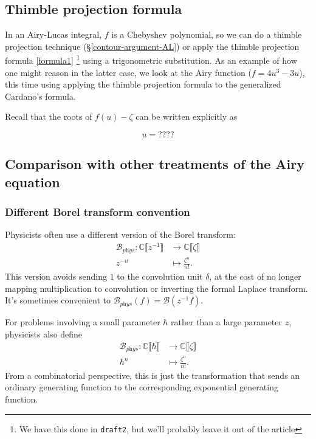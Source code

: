 \documentclass{article}
\theoremstyle{definition}
\newcommand{\maps}{\colon}
\newcommand{\C}{\mathbb{C}}
\newcommand{\borel}{\mathcal{B}}
\begin{document}
\subsection{Thimble projection formula}

In an Airy-Lucas integral, $f$ is a Chebyshev polynomial, so we can do a thimble projection technique (\S \ref{contour-argument-AL}) or apply the thimble projection formula \eqref{formula1} \textcolor{red}{\footnote{We have this done in \texttt{draft2}, but we'll probably leave it out of the article}} using a trigonometric substitution. As an example of how one might reason in the latter case, we look at the Airy function ($f = 4u^3-3u$), this time using applying the thimble projection formula to the generalized Cardano's formula.

Recall that the roots of $f(u)-\zeta$ can be written explicitly as 

\begin{equation}
    u=????
\end{equation}


\subsection{Comparison with other treatments of the Airy equation}

\subsubsection{Different Borel transform convention} Physicists often use a different version of the Borel transform:
\begin{align*}
\borel_{\textit{phys}} \maps \C \llbracket z^{-1} \rrbracket & \to \C \llbracket \zeta \rrbracket \\
z^{-n} & \mapsto \frac{\zeta^n}{n!}.
\end{align*}
This version avoids sending $1$ to the convolution unit $\delta$, at the cost of no longer mapping multiplication to convolution or inverting the formal Laplace transform. It's sometimes convenient to $\borel_\textit{phys}(f) = \borel(z^{-1} f)$.

For problems involving a small parameter $\hbar$ rather than a large parameter $z$, physicists also define
\begin{align*}
\borel_{\textit{phys}} \maps \C \llbracket \hbar \rrbracket & \to \C \llbracket \zeta \rrbracket \\
\hbar^n & \mapsto \frac{\zeta^n}{n!}.
\end{align*}
From a combinatorial perspective, this is just the transformation that sends an ordinary generating function to the corresponding exponential generating function.
\end{document}
